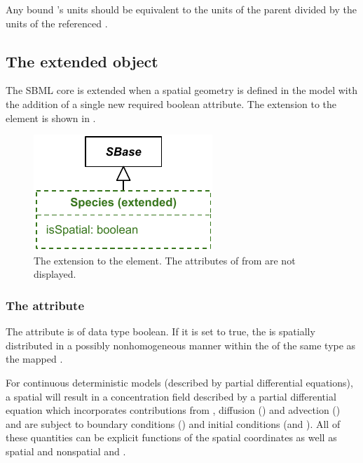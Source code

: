 Any bound \Parameter's units should be equivalent to the units of the parent \Compartment divided by the units of the referenced \DomainType. 



\subsection{The extended \Species object}
\label{extended-species-class}
The SBML core \Species is extended when a spatial geometry is defined in the model with the addition of a single new required boolean  attribute.  The extension to the \Species element is shown in .
 
\begin{figure}[ht]
  \includegraphics{figs/extended-species-uml}
  \caption{The extension to the \Species element. The attributes of \Species from \sbmlthreecore are not displayed.}
  \label{species-uml}
\end{figure}



\subsubsection{The \fixttspace{} attribute}
The  attribute is of data type boolean. If it is set to true, the \Species is spatially distributed in a possibly nonhomogeneous manner within the \Domains of the same type as the mapped \DomainType. 

For continuous deterministic models (described by partial differential equations), a spatial \Species will result in a concentration field described by a partial differential equation which incorporates contributions from \Reactions, diffusion (\DiffusionCoefficient) and advection (\AdvectionCoefficient) and are subject to boundary conditions (\BoundaryCondition) and initial conditions (\InitialAssignment and \Rule).  All of these quantities can be explicit functions of the spatial coordinates as well as spatial and nonspatial \Parameters and \Species.  

